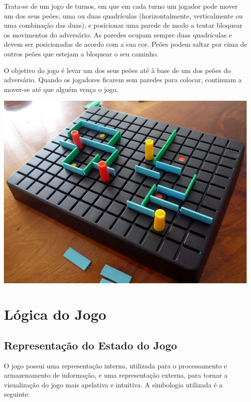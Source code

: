\documentclass[a4paper]{article}
\begin{document}
Trata-se de um jogo de turnos, em que em cada turno um jogador pode mover um dos seus peões, uma ou duas quadrículas (horizontalmente, verticalmente ou uma combinação das duas), e posicionar uma parede de modo a tentar bloquear os movimentos do adversário. As paredes ocupam sempre duas quadrículas e devem ser posicionadas de acordo com a sua cor. Peões podem saltar por cima de outros peões que estejam a bloquear o seu caminho. \par
O objetivo do jogo é levar um dos seus peões até à base de um dos peões do adversário. Quando os jogadores ficarem sem paredes para colocar, continuam a mover-se até que alguém vença o jogo. 

\begin{center}
\includegraphics[scale = 0.4]{fig2.jpg}
\end{center}

\section{Lógica do Jogo}


\subsection{Representação do Estado do Jogo} 

O jogo possui uma representação interna, utilizada para o processamento e armazenamento de informação, e uma representação externa, para tornar a visualização do jogo mais apelativa e intuitiva. A simbologia utilizada é a seguinte: 
\end{document}
